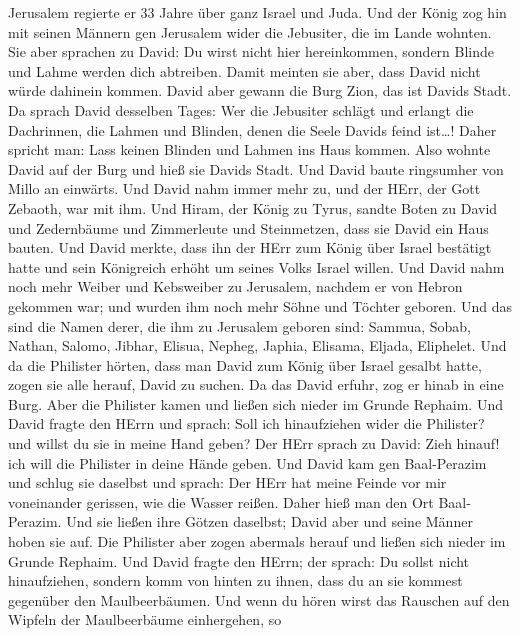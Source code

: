 Jerusalem regierte er 33 Jahre über ganz Israel und Juda. 
Und der König zog hin mit seinen Männern gen Jerusalem wider die
Jebusiter, die im Lande wohnten. Sie aber sprachen zu David: Du wirst
nicht hier hereinkommen, sondern Blinde und Lahme werden dich abtreiben.
Damit meinten sie aber, dass David nicht würde dahinein kommen.
 David aber gewann die Burg Zion, das ist Davids Stadt.
 Da sprach David desselben Tages: Wer die Jebusiter schlägt
und erlangt die Dachrinnen, die Lahmen und Blinden, denen die Seele
Davids feind ist\ldots! Daher spricht man: Lass keinen Blinden und
Lahmen ins Haus kommen.  Also wohnte David auf der Burg und
hieß sie Davids Stadt. Und David baute ringsumher von Millo an einwärts.
 Und David nahm immer mehr zu, und der HErr, der Gott
Zebaoth, war mit ihm.  Und Hiram, der König zu Tyrus,
sandte Boten zu David und Zedernbäume und Zimmerleute und Steinmetzen,
dass sie David ein Haus bauten.  Und David merkte, dass ihn
der HErr zum König über Israel bestätigt hatte und sein Königreich
erhöht um seines Volks Israel willen.  Und David nahm noch
mehr Weiber und Kebsweiber zu Jerusalem, nachdem er von Hebron gekommen
war; und wurden ihm noch mehr Söhne und Töchter geboren. 
Und das sind die Namen derer, die ihm zu Jerusalem geboren sind: Sammua,
Sobab, Nathan, Salomo,  Jibhar, Elisua, Nepheg, Japhia,
 Elisama, Eljada, Eliphelet.  Und da die
Philister hörten, dass man David zum König über Israel gesalbt hatte,
zogen sie alle herauf, David zu suchen. Da das David erfuhr, zog er
hinab in eine Burg.  Aber die Philister kamen und ließen
sich nieder im Grunde Rephaim.  Und David fragte den HErrn
und sprach: Soll ich hinaufziehen wider die Philister? und willst du sie
in meine Hand geben? Der HErr sprach zu David: Zieh hinauf! ich will die
Philister in deine Hände geben.  Und David kam gen
Baal-Perazim und schlug sie daselbst und sprach: Der HErr hat meine
Feinde vor mir voneinander gerissen, wie die Wasser reißen. Daher hieß
man den Ort Baal-Perazim.  Und sie ließen ihre Götzen
daselbst; David aber und seine Männer hoben sie auf.  Die
Philister aber zogen abermals herauf und ließen sich nieder im Grunde
Rephaim.  Und David fragte den HErrn; der sprach: Du sollst
nicht hinaufziehen, sondern komm von hinten zu ihnen, dass du an sie
kommest gegenüber den Maulbeerbäumen.  Und wenn du hören
wirst das Rauschen auf den Wipfeln der Maulbeerbäume einhergehen, so
